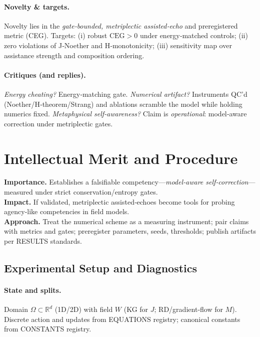\documentclass{article}
\begin{document}
\paragraph{Novelty \& targets.}
Novelty lies in the \emph{gate‑bounded, metriplectic assisted‑echo} and preregistered metric (CEG). Targets: (i) robust $\mathrm{CEG}>0$ under energy‑matched controls; (ii) zero violations of J‑Noether and H‑monotonicity; (iii) sensitivity map over assistance strength and composition ordering.

\paragraph{Critiques (and replies).}
\emph{Energy cheating?} Energy‑matching gate. \emph{Numerical artifact?} Instruments QC’d (Noether/H‑theorem/Strang) and ablations scramble the model while holding numerics fixed. \emph{Metaphysical self‑awareness?} Claim is \emph{operational}: model‑aware correction under metriplectic gates.

\section{Intellectual Merit and Procedure}

\noindent\textbf{Importance.} Establishes a falsifiable competency—\emph{model‑aware self‑correction}—measured under strict conservation/entropy gates.\\
\textbf{Impact.} If validated, metriplectic assisted‑echoes become tools for probing agency‑like competencies in field models.\\
\textbf{Approach.} Treat the numerical scheme as a measuring instrument; pair claims with metrics and gates; preregister parameters, seeds, thresholds; publish artifacts per RESULTS standards.

\subsection{Experimental Setup and Diagnostics}

\paragraph{State and splits.}
Domain $\Omega\subset\mathbb{R}^d$ (1D/2D) with field $W$ (KG for $J$; RD/gradient‑flow for $M$). Discrete action and updates from EQUATIONS registry; canonical constants from CONSTANTS registry.
\end{document}
